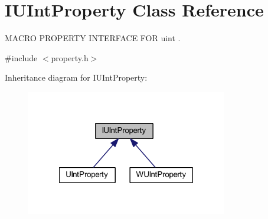 \hypertarget{class_i_u_int_property}{\section{I\-U\-Int\-Property Class Reference}
\label{class_i_u_int_property}
}


M\-A\-C\-R\-O P\-R\-O\-P\-E\-R\-T\-Y I\-N\-T\-E\-R\-F\-A\-C\-E F\-O\-R uint .  




{\ttfamily \#include $<$property.\-h$>$}



Inheritance diagram for I\-U\-Int\-Property\-:
\nopagebreak
\begin{figure}[H]
\begin{center}
\leavevmode
\includegraphics[width=249pt]{class_i_u_int_property__inherit__graph}
\end{center}
\end{figure}
